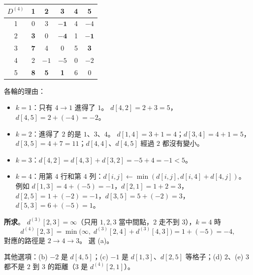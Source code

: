 \begin{pastsoln}
\begin{center}
\medskip
\begin{tabular}{c|ccccc}
$D^{(4)}$ & 1 & 2 & 3 & 4 & 5 \\ \hline
1 & 0 & 3 & $\mathbf{-1}$ & 4 & $-4$ \\
2 & \textbf{3} & 0 & $\mathbf{-4}$ & 1 & $\mathbf{-1}$ \\
3 & \textbf{7} & 4 & 0 & 5 & \textbf{3} \\
4 & 2 & $-1$ & $-5$ & 0 & $-2$ \\
5 & \textbf{8} & \textbf{5} & \textbf{1} & 6 & 0 \\
\end{tabular}
\end{center}
各輪的理由：
\begin{itemize}
\item $k = 1$：只有 $4 \to 1$ 進得了 $1$。 $d[4, 2] = 2 + 3 = 5$，$d[4, 5] = 2 + (-4) = -2$。
\item $k = 2$：進得了 $2$ 的是 $1$、$3$、$4$。 $d[1, 4] = 3 + 1 = 4$；$d[3, 4] = 4 + 1 = 5$，
$d[3, 5] = 4 + 7 = 11$；$d[4, 4]$、$d[4, 5]$ 經過 $2$ 都沒有變小。
\item $k = 3$：$d[4, 2] = d[4, 3] + d[3, 2] = -5 + 4 = -1 < 5$。
\item $k = 4$：用第 $4$ 行和第 $4$ 列：$d[i, j] \gets \min(d[i, j], d[i, 4] + d[4, j])$。 例如
$d[1, 3] = 4 + (-5) = -1$，$d[2, 1] = 1 + 2 = 3$，$d[2, 5] = 1 + (-2) = -1$，$d[3, 5] = 5 + (-2) = 3$，
$d[5, 3] = 6 + (-5) = 1$。
\end{itemize}

\textbf{所求}。 $d^{(3)}[2, 3] = \infty$（只用 $1, 2, 3$ 當中間點，$2$ 走不到 $3$），$k = 4$ 時
\[
d^{(4)}[2, 3] = \min\bigl(\infty,\; d^{(3)}[2, 4] + d^{(3)}[4, 3]\bigr) = 1 + (-5) = -4,
\]
對應的路徑是 $2 \to 4 \to 3$。 選 (a)。

其他選項：(b) $-2$ 是 $d[4, 5]$；(c) $-1$ 是 $d[1, 3]$、$d[2, 5]$ 等格子；(d) $2$、(e) $3$ 都不是
$2$ 到 $3$ 的距離（$3$ 是 $d^{(4)}[2, 1]$）。
\end{pastsoln}
